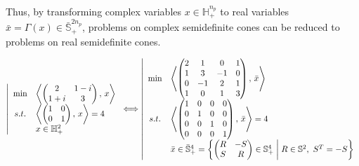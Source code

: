 Thus, by transforming complex variables $x \in \mathbb{H}^{n_p}_+$ to real variables $\bar{x} = \Gamma(x) \in \bar{\mathbb{S}}^{2n_p}_+$, problems on complex semidefinite cones can be reduced to problems on real semidefinite cones.

\begin{example}
\begin{equation*}
    \left|
    \begin{array}{cl}
        \min & \left\langle \begin{pmatrix}
            2 & 1-i \\
            1+i & 3
        \end{pmatrix}, \, x \right\rangle \\
        s.t. 
        & \left\langle \begin{pmatrix}
            1 & 0 \\ 
            0 & 1
        \end{pmatrix}, \, x \right\rangle = 4 \\
        & x\in \mathbb{H}^2_+ 
    \end{array}
    \right.
    \Longleftrightarrow
    \left|
    \begin{array}{cl}
        \min & \left\langle \begin{pmatrix}
            2 & 1 & 0 & 1 \\
            1 & 3 & -1 & 0 \\
            0 & -1 & 2 & 1 \\
            1 & 0 & 1 & 3
        \end{pmatrix}, \, \bar{x} \right\rangle \\
        s.t. 
        & \left\langle \begin{pmatrix}
            1 & 0 & 0 & 0 \\ 
            0 & 1 & 0 & 0 \\ 
            0 & 0 & 1 & 0 \\ 
            0 & 0 & 0 & 1
        \end{pmatrix}, \, \bar{x} \right\rangle = 4 \\
        & \bar{x}\in \bar{\mathbb{S}}^4_+ = \left\{\begin{pmatrix}
            R & -S\\
            S & R
        \end{pmatrix} \in \mathbb{S}^4_+ \;\middle|\; R\in \mathbb{S}^2, ~ S^T=-S\right\}
    \end{array}
    \right.
\end{equation*}
\end{example}



